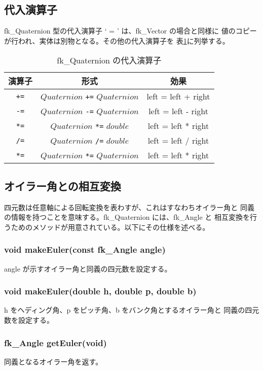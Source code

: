 \subsection{代入演算子}
fk\_Quaternion 型の代入演算子 ` = ' は、fk\_Vector の場合と同様に
値のコピーが行われ、実体は別物となる。その他の代入演算子を
表\ref{tbl:fkQ3}に列挙する。
\begin{table}[H]
\caption{fk\_Quaternion の代入演算子}
\label{tbl:fkQ3}
\begin{center}
\begin{tabular}{|c|c|c|}
\hline
演算子 & 形式 & 効果 \\ \hline \hline
\verb-+=- & \(Quaternion\) \verb-+=- \(Quaternion\) &
	left = left + right \\ \hline
\verb+-=+ & \(Quaternion\) \verb+-=+ \(Quaternion\) &
	left = left - right \\ \hline
\verb+*=+ & \(Quaternion\) \verb+*=+ \(double\) &
	left = left * right \\ \hline
\verb+/=+ & \(Quaternion\) \verb+/=+ \(double\) &
	left = left / right \\ \hline
\verb+*=+ & \(Quaternion\) \verb+*=+ \(Quaternion\) &
	left = left * right \\ \hline
\end{tabular}
\end{center}
\end{table}
\subsection{オイラー角との相互変換}
四元数は任意軸による回転変換を表わすが、これはすなわちオイラー角と
同義の情報を持つことを意味する。fk\_Quaternion には、fk\_Angle と
相互変換を行うためのメソッドが用意されている。以下にその仕様を述べる。

\subsubsection*{void makeEuler(const fk\_Angle angle)}
angle が示すオイラー角と同義の四元数を設定する。

\subsubsection*{void makeEuler(double h, double p, double b)}
h をヘディング角、p をピッチ角、b をバンク角とするオイラー角と
同義の四元数を設定する。

\subsubsection*{fk\_Angle getEuler(void)}
同義となるオイラー角を返す。

